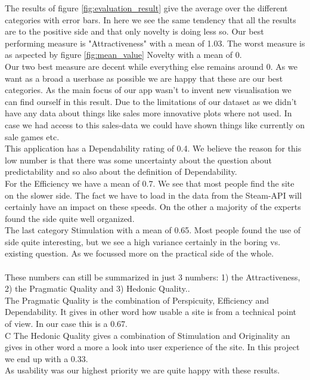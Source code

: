 \documentclass{article}
\begin{document}
	The results of figure \ref{fig:evaluation_result} give the average over the different categories with error bars. In here we see the same tendency that all the results are to the positive side and that only novelty is doing less so. Our best performing measure is "Attractiveness" with a mean of 1.03. The worst measure is as aspected by figure \ref{fig:mean_value} Novelty with a mean of 0.\\
	Our two best measure are decent while everything else remains around 0. As we want as a broad a userbase as possible we are happy that these are our best categories. As the main focus of our app wasn't to invent new visualisation we can find ourself in this result. Due to the limitations of our dataset as we didn't have any data about things like sales more innovative plots where not used. In case we had access to this sales-data we could have shown things like currently on sale games etc.\\
	This application has a Dependability rating of 0.4. We believe the reason for this low number is that there was some uncertainty about the question about predictability and so also about the definition of Dependability.\\
	For the Efficiency we have a mean of 0.7. We see that most people find the site on the slower side. The fact we have to load in the data from the Steam-API will certainly have an impact on these speeds. On the other a majority of the experts found the side quite well organized.\\
	The last category Stimulation with a mean of 0.65. Most people found the use of side quite interesting, but we see a high variance certainly in the boring vs. existing question. As we focussed more on the practical side of the whole.\\
	\\
	These numbers can still be summarized in just 3 numbers: 1) the Attractiveness, 2) the Pragmatic Quality and 3) Hedonic Quality..\\
	The Pragmatic Quality is the combination of Perspicuity, Efficiency and Dependability. It gives in other word how usable a site is from a technical point of view. In our case this is a 0.67.\\C
	The Hedonic Quality gives a combination of Stimulation and Originality an gives in other word a more a look into user experience of the site. In this project we end up with a 0.33.\\
	As usability was our highest priority we are quite happy with these results.\\
	
\end{document}
